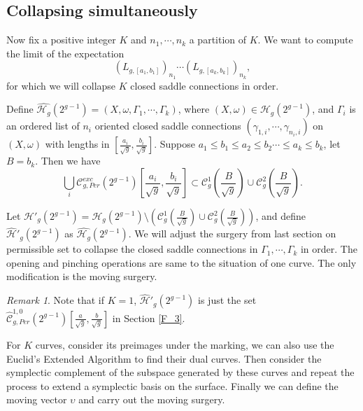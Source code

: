 \documentclass[12pt]{amsart} %
\theoremstyle{definition}
\theoremstyle{remark}
\newtheorem{remark}[theorem]{Remark}
\numberwithin{equation}{section}
\renewcommand\H{{\mathcal H}}
\begin{document}
\subsection{Collapsing simultaneously}
Now fix a positive integer $K$ and $n_1,\cdots,n_k$ a partition of $K$.
We want to compute the limit of the expectation
$$(L_{g,[a_1,b_1]})_{n_1}\cdots (L_{g,[a_k,b_k]})_{n_k},$$
for which we will collapse $K$ closed saddle connections in order.


Define $\hat{\H_g}(2^{g-1})=(X,\omega,\Gamma_1,\cdots,\Gamma_k)$, 
where $(X,\omega)\in \H_g(2^{g-1})$, 
and $\Gamma_i$ is an ordered list of $n_i$ oriented closed saddle connections $(\gamma_{1,i},\cdots,\gamma_{n_i,i})$ on $(X,\omega)$
with lengths in $[\frac{a_i}{\sqrt{g}},\frac{b_i}{\sqrt{g}}]$. 
Suppose $a_1\leq b_1 \leq a_2\leq b_2 \cdots \leq a_k \leq b_k$, let $B=b_k$.
Then we have
$$\bigcup_i \mathcal{C}^{exc}_{g,Per}(2^{g-1})[\frac{a_i}{\sqrt{g}},\frac{b_i}{\sqrt{g}}]\subset \mathcal{C}_g^{1}(\frac{B}{\sqrt{g}})\cup \mathcal{C}_g^{2}(\frac{B}{\sqrt{g}}).$$

Let $\H'_g(2^{g-1})=\H_g(2^{g-1})\setminus (\mathcal{C}_g^{1}(\frac{B}{\sqrt{g}})\cup \mathcal{C}_g^{2}(\frac{B}{\sqrt{g}}))$, and define
$\hat{\H}'_g(2^{g-1})$ as $\hat{\H_g}(2^{g-1})$.
We will adjust the surgery from last section on permissible set to collapse the closed saddle connections in
$\Gamma_1,\cdots,\Gamma_k$ in order.
The opening and pinching operations are same to the situation of one curve. The only modification is the moving surgery.

\begin{remark}
Note that if $K=1$, $\hat{\H}'_g(2^{g-1})$ is just the set $\hat{\mathcal{C}}^{1,0}_{g,Per}(2^{g-1})[\frac{a}{\sqrt{g}},\frac{b}{\sqrt{g}}]$ in Section \ref{F_3}.
\end{remark}

For $K$ curves, consider its preimages under the marking, we can also use the Euclid's Extended Algorithm to find their dual curves. Then consider the symplectic complement
of the subspace generated by these curves and repeat the process to extend a symplectic basis on the surface. Finally we can define the moving vector $\upsilon$ and carry out 
the moving surgery.
\end{document}

